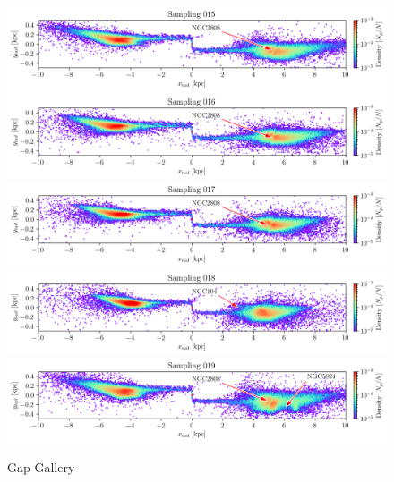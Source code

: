 \documentclass[]{aa}
\begin{document}
\begin{appendix}
    \begin{figure}
      \centering
      \includegraphics[width=\linewidth]{gallery_of_gaps_monte-carlo-015.png}
      \includegraphics[width=\linewidth]{gallery_of_gaps_monte-carlo-016.png}
      \includegraphics[width=\linewidth]{gallery_of_gaps_monte-carlo-017.png}
      \includegraphics[width=\linewidth]{gallery_of_gaps_monte-carlo-018.png}
      \includegraphics[width=\linewidth]{gallery_of_gaps_monte-carlo-019.png}
      \caption{Gap Gallery}
      \label{fig:TailCoordinates}
    \end{figure}        



\end{appendix}
\end{document}
